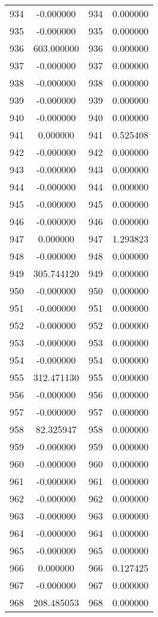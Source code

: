 \documentclass[12pt]{article}
\begin{document}
\begin{longtable}{@{}cccc@{}}
934 & -0.000000 & 934 & 0.000000 \\
935 & -0.000000 & 935 & 0.000000 \\
936 & 603.000000 & 936 & 0.000000 \\
937 & -0.000000 & 937 & 0.000000 \\
938 & -0.000000 & 938 & 0.000000 \\
939 & -0.000000 & 939 & 0.000000 \\
940 & -0.000000 & 940 & 0.000000 \\
941 & 0.000000 & 941 & 0.525408 \\
942 & -0.000000 & 942 & 0.000000 \\
943 & -0.000000 & 943 & 0.000000 \\
944 & -0.000000 & 944 & 0.000000 \\
945 & -0.000000 & 945 & 0.000000 \\
946 & -0.000000 & 946 & 0.000000 \\
947 & 0.000000 & 947 & 1.293823 \\
948 & -0.000000 & 948 & 0.000000 \\
949 & 305.744120 & 949 & 0.000000 \\
950 & -0.000000 & 950 & 0.000000 \\
951 & -0.000000 & 951 & 0.000000 \\
952 & -0.000000 & 952 & 0.000000 \\
953 & -0.000000 & 953 & 0.000000 \\
954 & -0.000000 & 954 & 0.000000 \\
955 & 312.471130 & 955 & 0.000000 \\
956 & -0.000000 & 956 & 0.000000 \\
957 & -0.000000 & 957 & 0.000000 \\
958 & 82.325947 & 958 & 0.000000 \\
959 & -0.000000 & 959 & 0.000000 \\
960 & -0.000000 & 960 & 0.000000 \\
961 & -0.000000 & 961 & 0.000000 \\
962 & -0.000000 & 962 & 0.000000 \\
963 & -0.000000 & 963 & 0.000000 \\
964 & -0.000000 & 964 & 0.000000 \\
965 & -0.000000 & 965 & 0.000000 \\
966 & 0.000000 & 966 & 0.127425 \\
967 & -0.000000 & 967 & 0.000000 \\
968 & 208.485053 & 968 & 0.000000 \\

\end{longtable}
\end{document}
